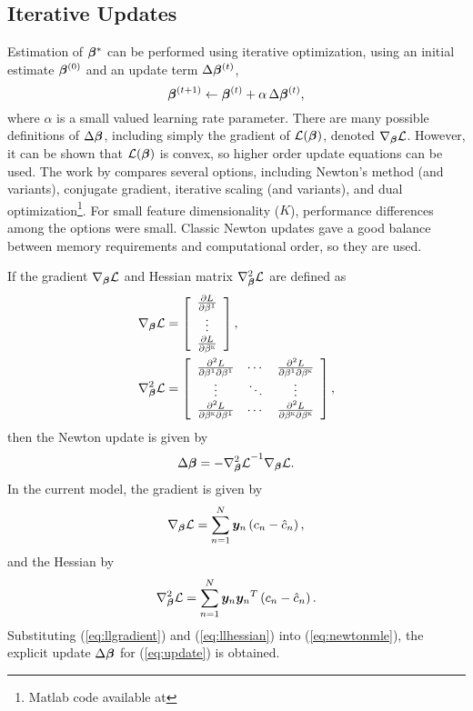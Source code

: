 \subsection{Iterative Updates}
Estimation of $\bm{\beta}^*$ can be performed using iterative optimization, using an initial estimate $\bm{\beta}^{(0)}$ and an update term $\Delta\bm{\beta}^{(t)}$,
\begin{equation}
\bm{\beta}^{(t+1)} \leftarrow \bm{\beta}^{(t)} + \alpha\thinspace\Delta\bm{\beta}^{(t)},
\label{eq:update}
\end{equation}
where $\alpha$ is a small valued learning rate parameter. There are many possible definitions of $\Delta\bm{\beta}$, including simply the gradient of $\mathcal{L}(\bm{\beta})$, denoted $\nabla_{\bm{\beta}}\mathcal{L}$. However, it can be shown that $\mathcal{L}(\bm{\beta})$ is convex, so higher order update equations can be used. The work by \citeauthor{Minka2003} \cite{Minka2003} compares several options, including Newton's method (and variants), conjugate gradient, iterative scaling (and variants), and dual optimization\footnote{Matlab code available at }. For small feature dimensionality ($K$), performance differences among the options were small. Classic Newton updates gave a good balance between memory requirements and computational order, so they are used.
\par
If the gradient $\nabla_{\bm{\beta}}\mathcal{L}$ and Hessian matrix $\nabla^2_{\bm{\beta}}\mathcal{L}$ are defined as
\begin{align}
\nabla_{\bm{\beta}}\mathcal{L} &= \left[\begin{array}{c}
\frac{\partial L}{\partial\beta^1}\\\vdots\\\frac{\partial L}{\partial\beta^{\textsc{k}}}
\end{array}\right],\label{eq:llgradient0}\\
\nabla^2_{\bm{\beta}}\mathcal{L} &= \left[\begin{array}{ccc}
\frac{\partial^2 L}{\partial\beta^1\partial\beta^1}&\cdots&\frac{\partial^2 L}{\partial\beta^1\partial\beta^{\textsc{k}}}\\
\vdots&\ddots&\vdots\\
\frac{\partial^2 L}{\partial\beta^{\textsc{k}}\partial\beta^1}&\cdots&\frac{\partial^2 L}{\partial\beta^{\textsc{k}}\partial\beta^{\textsc{k}}}
\end{array}\right]\label{eq:llhessian0},
\end{align}
then the Newton update is given by
\begin{equation}
\Delta\bm{\beta} = -{\nabla^2_{\bm{\beta}}\mathcal{L}}^{-1}\nabla_{\bm{\beta}}\mathcal{L}.
\label{eq:newtonmle}
\end{equation}
In the current model, the gradient is given by 
\begin{equation}
\nabla_{\bm{\beta}}\mathcal{L} = \sum_{n=1}^{N} \bm{y}_n\left(c_n - \hat{c}_n\right),
\label{eq:llgradient}
\end{equation}
and the Hessian by
\begin{equation}
\nabla^2_{\bm{\beta}}\mathcal{L} = \sum_{n=1}^{N} \bm{y}_n{\bm{y}_n}^T \left(c_n - \hat{c}_n\right).
\label{eq:llhessian}
\end{equation}
Substituting (\ref{eq:llgradient}) and (\ref{eq:llhessian}) into (\ref{eq:newtonmle}), the explicit update  $\Delta\bm{\beta}$ for (\ref{eq:update}) is obtained.
